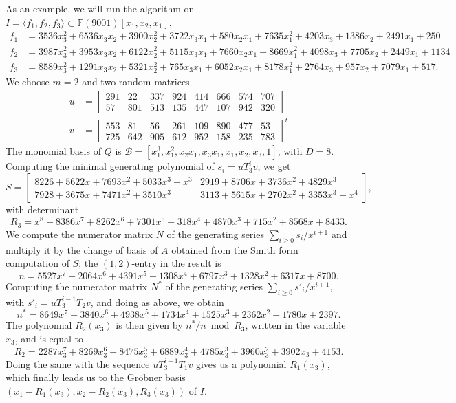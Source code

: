 \documentclass[12pt]{article}
\begin{document}
As an example, we will run the algorithm on $I = \langle f_1, f_2, f_3 \rangle \subset \mathbb{F}(9001)[x_1,x_2,x_1]$,
\begin{align*}
f_1 &= 3536x_3^2 +6536x_3x_2 + 3900x_2^2 + 3722x_3x_1 + 580x_2x_1 + 7635x_1^2 + 4203x_3 + 1386x_2 + 2491x_1 + 250\\
f_2 &= 3987x_3^2 + 3953x_3x_2 +6122x_2^2 +5115x_3x_1 +7660x_2x_1 +8669x_1^2 + 4098x_3 +7705x_2 + 2449x_1 + 1134\\
f_3 &= 8589x_3^2 + 1291x_3x_2 +5321x_2^2 + 765x_3x_1 +6052x_2x_1 +8178x_1^2 + 2764x_3 + 957x_2 +7079x_1 + 517.
\end{align*}
We choose $m = 2$ and two random matrices
\begin{align*}
u &= \begin{bmatrix}
291&  22& 337& 924& 414& 666& 574& 707\\
57& 801& 513& 135& 447& 107& 942& 320
\end{bmatrix}\\
v &= \begin{bmatrix}
553&  81&  56& 261& 109& 890& 477&  53\\
725& 642& 905& 612& 952& 158& 235& 783
\end{bmatrix} ^ {t}
\end{align*}
The monomial basis of $Q$ is $\mathscr{B}=[x_1^3, x_1^2, x_2x_1, x_3x_1, x_1, x_2, x_3, 1]$, with $D = 8$. 
Computing the minimal generating polynomial of $s_i=u T_3^i v$, we get
$$S= \begin{bmatrix}
8226 + 5622x + 7693x^2 + 5033x^3 + x^3&     2919 + 8706x + 3736x^2 + 4829x^3\\
7928 + 3675x + 7471x^2 + 3510x^3  &        3113 + 5615x + 2702x^2 + 3353x^3 + x^4
\end{bmatrix},$$
with determinant
$$R_3 =x^8 + 8386x^7 + 8262x^6 + 7301x^5 + 318x^4 + 4870x^3 + 715x^2 + 8568x + 8433.$$
We compute the numerator matrix $N$ of the generating series $\sum_{i \ge 0} s_i/x^{i+1}$
and multiply it by the change of basis of $A$ obtained from the Smith form computation of 
$S$; the $(1,2)$-entry in the result is
$$n = 5527x^7 + 2064x^6 + 4391x^5 + 1308x^4 + 6797x^3 + 1328x^2 + 6317x + 8700.$$
Computing the numerator matrix $N^*$ of the generating series $\sum_{i \ge 0} s'_i/x^{i+1}$,
with $s'_i = uT_3^{i-1} T_2 v$, and doing as above, we obtain
$$n^* = 8649x^7 + 3840x^6 + 4938x^5 + 1734x^4 + 1525x^3 + 2362x^2 + 1780x + 2397.$$
The polynomial $R_2(x_3)$ is then given by $n^*/n \bmod R_3$, written in the variable
$x_3$, and
is equal to 
$$R_2 = 2287x_3^7 + 8269x_3^6 + 8475x_3^5 + 6889x_3^4 + 4785x_3^3 + 3960x_3^2 + 3902x_3 + 4153.$$
Doing the same with the sequence $uT_3^{i-1} T_1 v$ gives us a polynomial $R_1(x_3)$,
which finally leads us to the Gr\"obner basis $(x_1-R_1(x_3), x_2-R_2(x_3),R_3(x_3))$
of $I$.
\end{document}
